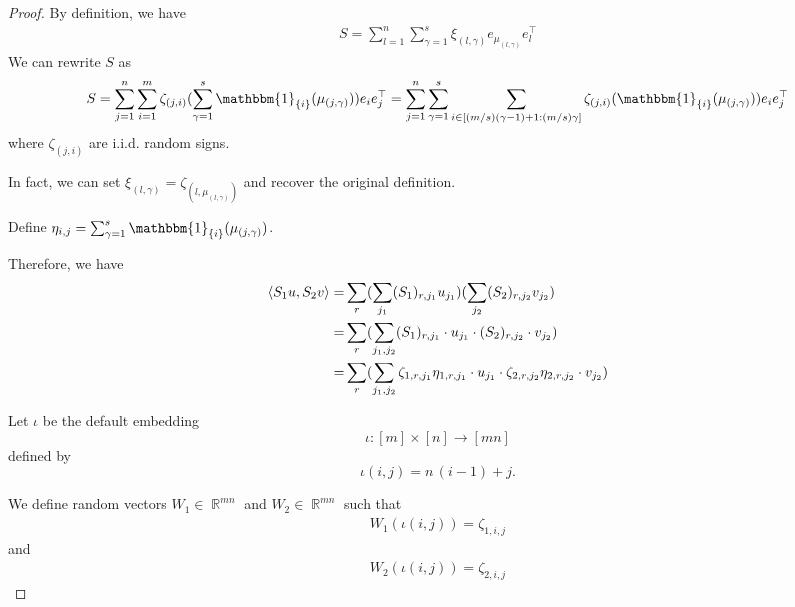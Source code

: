\documentclass[11pt]{amsart}
\numberwithin{equation}{section}
\numberwithin{equation}{section}
\DeclareMathOperator{\R}{\mathbb{R}}
\DeclarePairedDelimiter{\ip}{\langle}{\rangle}
\begin{document}
\begin{proof}
By definition, we have
\begin{align*}
    S = \sum_{l=1}^n \sum_{\gamma=1}^s \xi_{(l,\gamma)} e_{\mu_{(l, \gamma)}} e_l ^\top
\end{align*}
We can rewrite $S$ as
\begin{align*}
    S = \sum_{j=1}^n \sum_{i=1}^m \zeta_{(j,i)} (\sum_{\gamma=1}^s\mathbbm{1}_{\{i\}}(\mu_{(j, \gamma)}))e_{i} e_j ^\top
=\sum_{j=1}^n \sum_{\gamma=1}^s \sum_{i \in [(m/s)(\gamma-1)+1:(m/s)\gamma]} \zeta_{(j,i)} (\mathbbm{1}_{\{i\}}(\mu_{(j, \gamma)}))e_{i} e_j ^\top
\end{align*}
where $\zeta_{(j,i)}$ are i.i.d. random signs.

In fact, we can set $\xi_{(l,\gamma)} = \zeta_{(l, \mu_{(l, \gamma)})}$ and recover the original definition.

Define $\eta_{i,j}=\sum_{\gamma=1}^s\mathbbm{1}_{\{i\}}(\mu_{(j, \gamma)})$. 

Therefore, we have
\begin{align*}
    \ip{S_1u,S_2v}=&\sum_r (\sum_{j_1} (S_1)_{r,j_1}u_{j_1})(\sum_{j_2} (S_2)_{r,j_2}v_{j_2})
    \\=&\sum_r (\sum_{j_1,j_2} (S_1)_{r,j_1}\cdot u_{j_1}\cdot(S_2)_{r,j_2}\cdot v_{j_2})
    \\=&\sum_r (\sum_{j_1,j_2} \zeta_{1,r,j_1}\eta_{1,r,j_1}\cdot u_{j_1}\cdot \zeta_{2,r,j_2}\eta_{2,r,j_2}\cdot v_{j_2})
\end{align*}

Let $\iota$ be the default embedding 
\[
\iota : [m] \times [n] \to [mn]
\]
defined by
\[
\iota(i,j) = n\,(i-1) + j.
\]

We define random vectors $W_1 \in \R^{mn}$ and $W_2 \in \R^{mn}$ such that
\begin{align*}
    W_1(\iota(i,j))=\zeta_{1,i,j}
\end{align*}
and
\begin{align*}
    W_2(\iota(i,j))=\zeta_{2,i,j}
\end{align*}




\end{proof}
\end{document}
